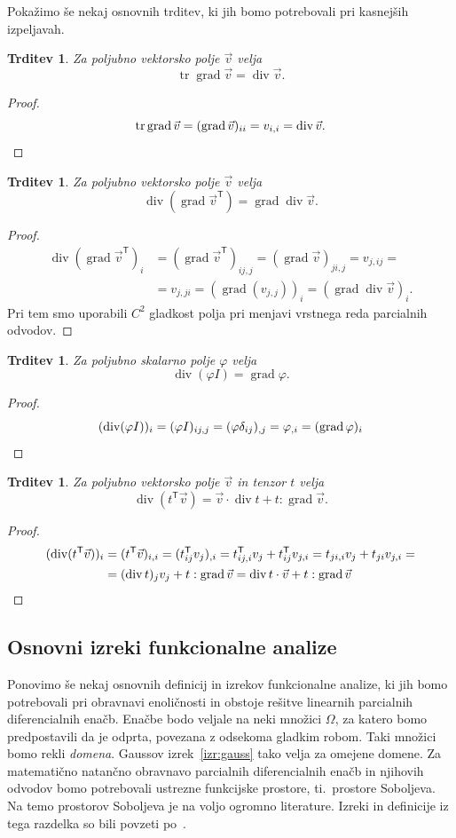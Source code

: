 \documentclass[12pt,a4paper,twoside]{article}
\theoremstyle{definition} %
\theoremstyle{plain} %
\newtheorem{trditev}[definicija]{Trditev}
\numberwithin{equation}{section}
\newcommand{\T}{\mathsf{T}}
\renewcommand{\div}{\operatorname{div}}
\newcommand{\grad}{\operatorname{grad}}
\renewcommand{\phi}{\varphi}
\newcommand{\vv}{\vec{v}}
\DeclareMathOperator{\tr}{tr}
\begin{document}
Pokažimo še nekaj osnovnih trditev, ki jih bomo potrebovali pri kasnejših
izpeljavah.
\begin{trditev}
  Za poljubno vektorsko polje $\vv$ velja
  \[ \tr\grad \vv = \div \vv. \]
\end{trditev}
\begin{proof}
\[
  \tr\grad\vv = (\grad\vv)_{ii} = v_{i,i} = \div \vv. \qedhere
\]
\end{proof}
\begin{trditev}
  Za poljubno vektorsko polje $\vv$ velja
  \[ \div(\grad\vv^\T) = \grad\div \vv.  \]
\end{trditev}
\begin{proof}
  \begin{align*}
  \div(\grad \vv^\T)_i &= (\grad\vv^\T)_{ij,j} = (\grad \vv)_{ji,j} = v_{j,ij} = \\
  &= v_{j,ji} = (\grad(v_{j,j}))_i = (\grad\div \vv)_i.
  \end{align*}
  Pri tem smo uporabili $C^2$ gladkost polja pri menjavi vrstnega reda parcialnih odvodov.
\end{proof}
\begin{trditev}
  Za poljubno skalarno polje $\phi$ velja
  \[ \div(\phi I) = \grad \phi.  \]
\end{trditev}
\begin{proof}
\[
  (\div(\phi I))_i = (\phi I)_{ij,j} = (\phi \delta_{ij})_{,j} = \phi_{,i} =
  (\grad \phi)_i \qedhere
\]
\end{proof}
\begin{trditev}
  Za poljubno vektorsko polje $\vv$ in tenzor $t$ velja
  \label{trd:div-tv}
  \[
    \div(t^\T \vv) = \vv \cdot \div t + t : \grad\vv.
    \]
\end{trditev}
\begin{proof}
\begin{align*}
  (\div(t^\T \vv))_i &= (t^\T\vv)_{i,i} = (t^\T_{ij} v_j)_{,i} =
    t^\T_{ij,i} v_j + t^\T_{ij} v_{j,i} =
    t_{ji,i} v_j + t_{ji} v_{j,i} = \\
    &=  (\div t)_j v_j + t:\grad \vv = \div t \cdot \vv + t:\grad \vv\qedhere
\end{align*}
\end{proof}

\subsection{Osnovni izreki funkcionalne analize}

Ponovimo še nekaj osnovnih definicij in izrekov funkcionalne analize, ki jih bomo potrebovali pri
obravnavi enoličnosti in obstoje rešitve linearnih parcialnih diferencialnih enačb. Enačbe bodo
veljale na neki množici $\Omega$, za katero bomo predpostavili da je odprta, povezana z odsekoma
gladkim robom.  Taki množici bomo rekli \emph{domena}. Gaussov izrek~\ref{izr:gauss} tako velja za
omejene domene. Za matematično natančno obravnavo parcialnih diferencialnih enačb in njihovih
odvodov bomo potrebovali ustrezne funkcijske prostore, ti.\ prostore Soboljeva.  Na temo prostorov
Soboljeva je na voljo ogromno literature. Izreki in definicije iz tega razdelka so bili povzeti
po~\cite{adams2003sobolev}.
\end{document}
